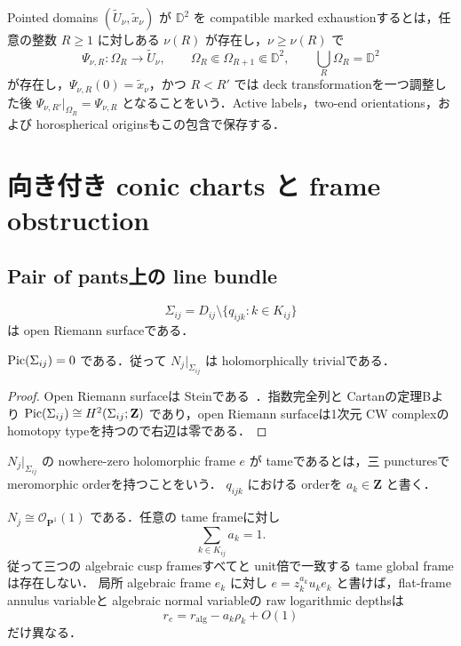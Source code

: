 \documentclass[a4paper,11pt]{ltjsarticle}
\numberwithin{equation}{section}
\theoremstyle{plain}
\theoremstyle{definition}
\theoremstyle{remark}
\newcommand{\PP}{\mathbf P}\newcommand{\CC}{\mathbf C}\newcommand{\RR}{\mathbf R}\newcommand{\ZZ}{\mathbf Z}\newcommand{\NN}{\mathbf N}
\begin{document}
\begin{definition}\label{sharp:def:compatible-exhaustion}
Pointed domains $(\widetilde U_\nu,\tilde x_\nu)$ が $\mathbb D^2$ を compatible marked exhaustionするとは，任意の整数 $R\ge1$ に対しある $\nu(R)$ が存在し，$\nu\ge\nu(R)$ で
\[
 \Psi_{\nu,R}:\Omega_R\longrightarrow\widetilde U_\nu,
 \qquad \Omega_R\Subset\Omega_{R+1}\Subset\mathbb D^2,
 \qquad \bigcup_R\Omega_R=\mathbb D^2
\]
が存在し，$\Psi_{\nu,R}(0)=\tilde x_\nu$，かつ $R<R'$ では deck transformationを一つ調整した後
$\Psi_{\nu,R'}|_{\Omega_R}=\Psi_{\nu,R}$ となることをいう．Active labels，two-end orientations，および horospherical originsもこの包含で保存する．
\end{definition}

\section{向き付き conic charts と frame obstruction}\label{sharp:sec:oriented-gauge}

\subsection{Pair of pants上の line bundle}

\[
 \Sigma_{ij}=D_{ij}\setminus\{q_{ijk}:k\in K_{ij}\}
\]
は open Riemann surfaceである．

\begin{lemma}\label{sharp:lem:picard-zero}
$\operatorname{Pic}(\Sigma_{ij})=0$ である．従って $N_j|_{\Sigma_{ij}}$ は holomorphically trivialである．
\end{lemma}

\begin{proof}
Open Riemann surfaceは Steinである~\cite{Forster}．指数完全列と Cartanの定理Bより
$\Pic(\Sigma_{ij})\cong H^2(\Sigma_{ij};\ZZ)$ であり，open Riemann surfaceは1次元 CW complexの homotopy typeを持つので右辺は零である．
\end{proof}


\begin{definition}\label{sharp:def:tame-frame}
$N_j|_{\Sigma_{ij}}$ の nowhere-zero holomorphic frame $e$ が tameであるとは，三 puncturesで meromorphic orderを持つことをいう．
$q_{ijk}$ における orderを $a_k\in\ZZ$ と書く．
\end{definition}

\begin{proposition}\label{sharp:prop:frame-obstruction}
$N_j\cong\mathcal O_{\PP^1}(1)$ である．任意の tame frameに対し
\begin{equation}\label{sharp:eq:frame-degree}
 \sum_{k\in K_{ij}}a_k=1.
\end{equation}
従って三つの algebraic cusp framesすべてと unit倍で一致する tame global frameは存在しない．
局所 algebraic frame $e_k$ に対し $e=z_k^{a_k}u_k e_k$ と書けば，flat-frame annulus variableと algebraic normal variableの raw logarithmic depthsは
\begin{equation}\label{sharp:eq:frame-shear}
 r_e=r_{\mathrm{alg}}-a_k\rho_k+O(1)
\end{equation}
だけ異なる．
\end{proposition}
\end{document}
